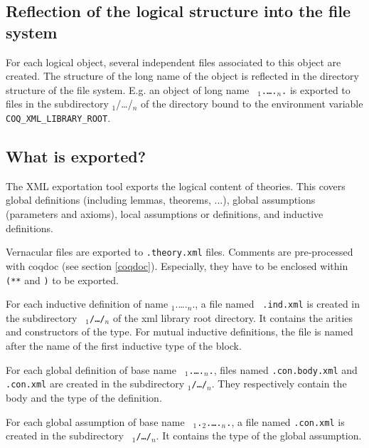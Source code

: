 \subsection{Reflection of the logical structure into the file system}

For each {\Coq} logical object, several independent files associated
to this object are created.  The structure of the long name of the
object is reflected in the directory structure of the file system.
E.g. an object of long name {\tt
{\ident$_1$}.{\ldots}.{\ident$_n$}.{\ident}} is exported to files in the
subdirectory {{\ident$_1$}/{\ldots}/{\ident$_n$}} of the directory 
bound to the environment variable {\tt COQ\_XML\_LIBRARY\_ROOT}.

\subsection{What is exported?}

The XML exportation tool exports the logical content of {\Coq}
theories. This covers global definitions (including lemmas, theorems,
...), global assumptions (parameters and axioms), local assumptions or
definitions, and inductive definitions.

Vernacular files are exported to {\tt .theory.xml} files. 
Comments are pre-processed with {\sf coqdoc} (see section
\ref{coqdoc}). Especially, they have to be enclosed within {\tt (**}
and {\tt *)} to be exported.

For each inductive definition of name
{\ident$_1$}.{\ldots}.{\ident$_n$}.{\ident}, a file named {\tt
{\ident}.ind.xml} is created in the subdirectory {\tt
{\ident$_1$}/{\ldots}/{\ident$_n$}} of the xml library root
directory. It contains the arities and constructors of the type. For mutual inductive definitions, the file is named after the
name of the first inductive type of the block.

For each global definition of base name {\tt
{\ident$_1$}.{\ldots}.{\ident$_n$}.{\ident}}, files named
{\tt {\ident}.con.body.xml} and {\tt {\ident}.con.xml} are created in the
subdirectory {\tt {\ident$_1$}/{\ldots}/{\ident$_n$}}. They
respectively contain the body and the type of the definition.

For each global assumption of base name {\tt
{\ident$_1$}.{\ident$_2$}.{\ldots}.{\ident$_n$}.{\ident}}, a file
named {\tt {\ident}.con.xml} is created in the subdirectory {\tt
{\ident$_1$}/{\ldots}/{\ident$_n$}}.  It contains the type of the
global assumption.

